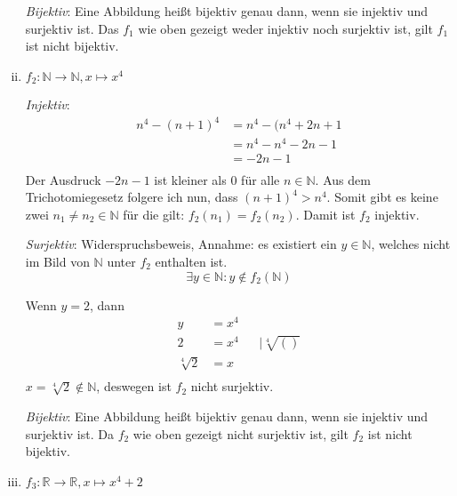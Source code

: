 \documentclass{article}
\begin{document}
\begin{enumerate}[(i)]
  \emph{Bijektiv}: Eine Abbildung heißt bijektiv genau dann, wenn sie injektiv und surjektiv ist.
  Das $f_1$ wie oben gezeigt weder injektiv noch surjektiv ist, gilt $f_1$ ist nicht bijektiv.
  
\item $f_2 \colon \mathbb{N} \to \mathbb{N}, x \mapsto x^4$


  \emph{Injektiv}:
  \begin{align*}
    n^4 - (n + 1)^4 &= n^4 - (n^4 + 2n + 1 \\
                    &= n^4 - n^4 - 2n - 1 \\
                    &= -2n - 1 \\
  \end{align*}
  Der Ausdruck $-2n -1$ ist kleiner als $0$ für alle $n \in \mathbb{N}$.
  Aus dem Trichotomiegesetz folgere ich nun, dass $(n + 1)^4 > n^4$.
  Somit gibt es keine zwei $n_1 \ne n_2 \in \mathbb{N}$ für die gilt: $f_2(n_1) = f_2(n_2)$.
  Damit ist $f_2$ injektiv.
  
  \emph{Surjektiv}: Widerspruchsbeweis, Annahme: es existiert ein $y \in \mathbb{N}$, welches nicht im Bild von
  $\mathbb{N}$ unter $f_2$ enthalten ist.
  \[
    \exists y \in \mathbb{N} \colon y \notin f_2(\mathbb{N}) 
  \]

  Wenn $y = 2$, dann
  \begin{align*}
    y  &= x^4 \\
    2 &= x^4 && | \sqrt[4]{()} \\
    \sqrt[4]{2} &= x \\
  \end{align*}
  $x = \sqrt[4]{2} \notin \mathbb{N}$, deswegen ist $f_2$ nicht surjektiv.
  
  \emph{Bijektiv}: Eine Abbildung heißt bijektiv genau dann, wenn sie injektiv und surjektiv ist.
  Da $f_2$ wie oben gezeigt nicht surjektiv ist, gilt $f_2$ ist nicht bijektiv.
  
\item $f_3 \colon \mathbb{R} \to \mathbb{R}, x \mapsto x^4 + 2$


\end{enumerate}
\end{document}
